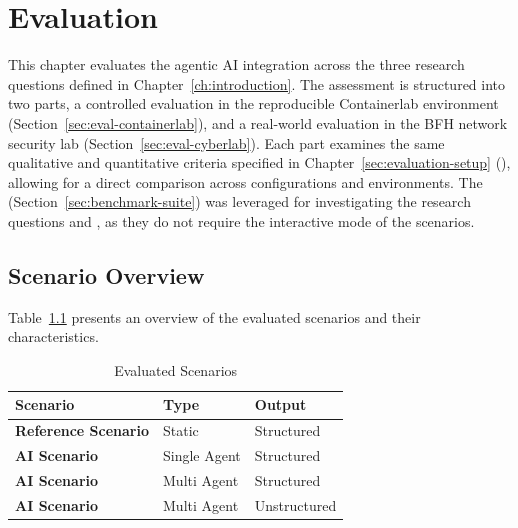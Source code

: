 
\chapter{Evaluation}\label{ch:evaluation}

This chapter evaluates the agentic \gls{AI} integration across the three research questions defined in Chapter~\ref{ch:introduction}.
The assessment is structured into two parts,
a controlled evaluation in the reproducible \gls{Containerlab} environment (Section~\ref{sec:eval-containerlab}),
and a real-world evaluation in the BFH network security lab (Section~\ref{sec:eval-cyberlab}).
Each part examines the same qualitative and quantitative criteria specified in Chapter~\ref{sec:evaluation-setup} (),
allowing for a direct comparison across configurations and environments.
The  (Section~\ref{sec:benchmark-suite}) was leveraged for investigating the research questions  and ,
as they do not require the interactive mode of the scenarios.

\section{Scenario Overview}\label{sec:scenario-overview}

Table~\ref{tab:evaluated-scenarios} presents an overview of the evaluated scenarios and their characteristics.

\begin{table}[h]
    \centering
    \begin{tabularx}{\linewidth}{lXX}
        \hline
        \textbf{Scenario} & \textbf{Type} & \textbf{Output} \\
        \hline
        \textbf{Reference Scenario} & Static & Structured  \\
        \textbf{AI Scenario} & Single Agent & Structured \\
        \textbf{AI Scenario} & Multi Agent & Structured \\
        \textbf{AI Scenario} & Multi Agent & Unstructured \\
        \hline
    \end{tabularx}
    \caption{Evaluated Scenarios}
    \label{tab:evaluated-scenarios}
\end{table}

